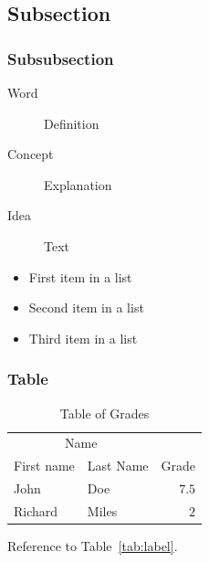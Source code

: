 \documentclass[
10pt, %
a4paper, %
oneside, %
headinclude,footinclude, %
BCOR5mm, %
]{scrartcl}
\begin{document}

\subsection{Subsection}
\lipsum[11] %

\subsubsection{Subsubsection}

\lipsum[12] %

\begin{description}
\item[Word] Definition
\item[Concept] Explanation
\item[Idea] Text
\end{description}

\lipsum[12] %

\begin{itemize}[noitemsep] %
\item First item in a list
\item Second item in a list
\item Third item in a list
\end{itemize}

\subsubsection{Table}

\lipsum[13] %

\begin{table}[hbt]
\caption{Table of Grades}
\centering
\begin{tabular}{llr}
\toprule
\multicolumn{2}{c}{Name} \\
\cmidrule(r){1-2}
First name & Last Name & Grade \\
\midrule
John & Doe & $7.5$ \\
Richard & Miles & $2$ \\
\bottomrule
\end{tabular}
\label{tab:label}
\end{table}

Reference to Table~\vref{tab:label}. %

\end{document}
